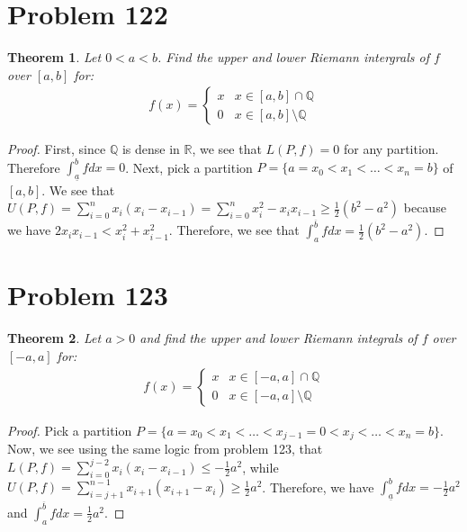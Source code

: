 \documentclass[psamsfonts]{amsart}
\newtheorem{thm}{Theorem}[section]
\theoremstyle{definition}
\theoremstyle{remark}
\numberwithin{equation}{section}
\begin{document}
\section{Problem 122}

\begin{thm}
Let $0 < a < b$. Find the upper and lower Riemann intergrals of $f$ over $[a,b]$ for:
\begin{eqnarray}
f(x) = \left\{ \begin{array}{ll}
x & x \in [a,b] \cap \mathbb{Q} \\
0 & x \in [a,b] \setminus \mathbb{Q} 
\end{array} \right.
\end{eqnarray}
\end{thm}

\begin{proof}
First, since $\mathbb{Q}$ is dense in $\mathbb{R}$, we see that $L(P,f) = 0$ for any partition. Therefore $\int_{\underline{a}}^b f dx = 0$. Next, pick a partition $P = \{ a = x_0 < x_1 < \ldots < x_n = b \}$ of $[a,b]$. We see that $U(P,f) = \sum_{i=0}^n x_i ( x_i - x_{i-1} ) = \sum_{i=0}^n x_i^2 - x_i x_{i-1} \geq \frac{1}{2} (b^2- a^2)$ because we have $2 x_i x_{i-1} < x_i^2 + x_{i-1}^2$. Therefore, we see that $\int_{a}^{\overline{b}} f dx = \frac{1}{2} (b^2 - a^2)$. 
\end{proof}

\section{Problem 123}

\begin{thm}
Let $a > 0$ and find the upper and lower Riemann integrals of $f$ over $[-a,a]$ for:
\begin{eqnarray}
f(x) = \left\{ \begin{array}{ll}
x & x \in [-a,a] \cap \mathbb{Q} \\
0 & x \in [-a,a] \setminus \mathbb{Q}
\end{array} \right.
\end{eqnarray}
\end{thm}

\begin{proof}
Pick a partition $P = \{ a = x_0 < x_1 < \ldots < x_{j-1} = 0 < x_j < \ldots < x_n = b \}$. Now, we see using the same logic from problem 123, that $L(P,f) = \sum_{i=0}^{j-2} x_i (x_i - x_{i-1}) \leq - \frac{1}{2} a^2$, while $U(P,f) = \sum_{i=j+1}^{n-1} x_{i+1} (x_{i+1} - x_i ) \geq \frac{1}{2} a^2$. Therefore, we have $\int_{\underline{a}}^b f dx = -\frac{1}{2} a^2 $ and $\int_{a}^{\overline{b}} f dx = \frac{1}{2} a^2$. 
\end{proof}
\end{document}
